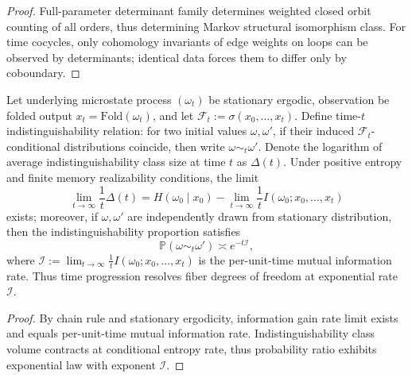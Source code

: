 \begin{proof}
Full-parameter determinant family determines weighted closed orbit counting of all orders, thus determining Markov structural isomorphism class.
For time cocycles, only cohomology invariants of edge weights on loops can be observed by determinants; identical data forces them to differ only by coboundary.
\end{proof}

\begin{theorem}\label{thm:xi-finite-time-distinguishability-mutual-information-rate}
Let underlying microstate process \((\omega_t)\) be stationary ergodic, observation be folded output \(x_t=\mathrm{Fold}(\omega_t)\), and let \(\mathcal F_t:=\sigma(x_0,\dots,x_t)\).
Define time-\(t\) indistinguishability relation: for two initial values \(\omega,\omega'\), if their induced \(\mathcal F_t\)-conditional distributions coincide, then write \(\omega\sim_t\omega'\).
Denote the logarithm of average indistinguishability class size at time \(t\) as \(\Delta(t)\).
Under positive entropy and finite memory realizability conditions, the limit
\[
\lim_{t\to\infty}\frac1t\Delta(t)
=
H(\omega_0\mid x_0)-\lim_{t\to\infty}\frac1t I(\omega_0;x_0,\dots,x_t)
\]
exists; moreover, if \(\omega,\omega'\) are independently drawn from stationary distribution, then the indistinguishability proportion satisfies
\[
\mathbb P(\omega\sim_t\omega')\asymp e^{-t\mathcal I},
\]
where \(\mathcal I:=\lim_{t\to\infty}\frac1t I(\omega_0;x_0,\dots,x_t)\) is the per-unit-time mutual information rate.
Thus time progression resolves fiber degrees of freedom at exponential rate \(\mathcal I\).
\end{theorem}

\begin{proof}
By chain rule and stationary ergodicity, information gain rate limit exists and equals per-unit-time mutual information rate.
Indistinguishability class volume contracts at conditional entropy rate, thus probability ratio exhibits exponential law with exponent \(\mathcal I\).
\end{proof}

